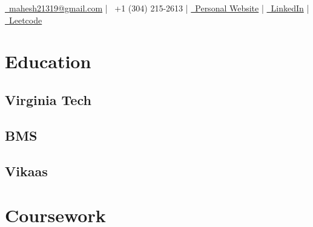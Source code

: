 \documentclass[]{resume-openfont}
\begin{document}
%
%
\lastupdated

%
%
{ 
\href{mailto:mahesh21319@gmail.com}{\faEnvelope \, mahesh21319@gmail.com} |
\faPhone \, +1 (304) 215-2613 |
\href{https://mahesh-maddhuru.github.io/}{\faUserTie \, Personal Website} |
\href{http://www.linkedin.com/in/mahesh-m97}{\faLinkedin \, LinkedIn} |
\href{https://leetcode.com/mahm/}{\faCode \, Leetcode}
}

%
%

\begin{minipage}[t]{0.33\textwidth}


\section{Education}

\subsection{Virginia Tech}
\sectionsep

\subsection{BMS}
\sectionsep

\subsection{Vikaas}
\sectionsep


\section{Coursework}

\end{minipage}
\end{document}
